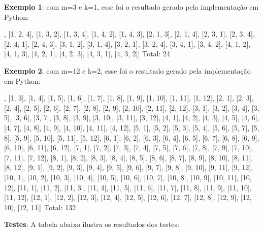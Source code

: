 \documentclass{article}
\begin{document}
\textbf{Exemplo 1}: com m=3 e k=1, esse foi o resultado gerado pela implementação em Python:

{\color{blue}
\begin{spverbatim}
[[1, 2, 3], [1, 2, 4], [1, 3, 2], [1, 3, 4], [1, 4, 2], [1, 4, 3], [2, 1, 3], [2, 1, 4], [2, 3, 1], [2, 3, 4], [2, 4, 1], [2, 4, 3], [3, 1, 2], [3, 1, 4], [3, 2, 1], [3, 2, 4], [3, 4, 1], [3, 4, 2], [4, 1, 2], [4, 1, 3], [4, 2, 1], [4, 2, 3], [4, 3, 1], [4, 3, 2]]
Total: 24

\end{spverbatim}
}

\textbf{Exemplo 2}: com m=12 e k=2, esse foi o resultado gerado pela implementação em Python:

{\color{blue}
\begin{spverbatim}
[[1, 2], [1, 3], [1, 4], [1, 5], [1, 6], [1, 7], [1, 8], [1, 9], [1, 10], [1, 11], [1, 12], [2, 1], [2, 3], [2, 4], [2, 5], [2, 6], [2, 7], [2, 8], [2, 9], [2, 10], [2, 11], [2, 12], [3, 1], [3, 2], [3, 4], [3, 5], [3, 6], [3, 7], [3, 8], [3, 9], [3, 10], [3, 11], [3, 12], [4, 1], [4, 2], [4, 3], [4, 5], [4, 6], [4, 7], [4, 8], [4, 9], [4, 10], [4, 11], [4, 12], [5, 1], [5, 2], [5, 3], [5, 4], [5, 6], [5, 7], [5, 8], [5, 9], [5, 10], [5, 11], [5, 12], [6, 1], [6, 2], [6, 3], [6, 4], [6, 5], [6, 7], [6, 8], [6, 9], [6, 10], [6, 11], [6, 12], [7, 1], [7, 2], [7, 3], [7, 4], [7, 5], [7, 6], [7, 8], [7, 9], [7, 10], [7, 11], [7, 12], [8, 1], [8, 2], [8, 3], [8, 4], [8, 5], [8, 6], [8, 7], [8, 9], [8, 10], [8, 11], [8, 12], [9, 1], [9, 2], [9, 3], [9, 4], [9, 5], [9, 6], [9, 7], [9, 8], [9, 10], [9, 11], [9, 12], [10, 1], [10, 2], [10, 3], [10, 4], [10, 5], [10, 6], [10, 7], [10, 8], [10, 9], [10, 11], [10, 12], [11, 1], [11, 2], [11, 3], [11, 4], [11, 5], [11, 6], [11, 7], [11, 8], [11, 9], [11, 10], [11, 12], [12, 1], [12, 2], [12, 3], [12, 4], [12, 5], [12, 6], [12, 7], [12, 8], [12, 9], [12, 10], [12, 11]]
Total: 132

\end{spverbatim}
}

\textbf{Testes}: A tabela abaixo ilustra os resultados dos testes:
\end{document}
